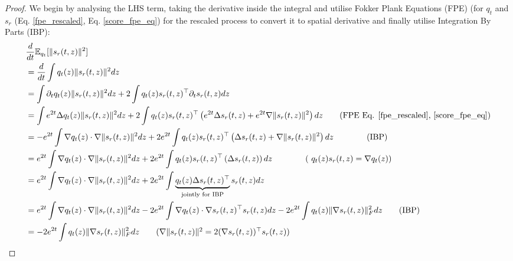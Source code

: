 \documentclass{article}
\begin{document}
\begin{proof}
We begin by analysing the LHS term, taking the derivative inside the integral and utilise Fokker Plank Equations (FPE) (for $q_t$ and $s_r$ (Eq. \ref{fpe_rescaled}, Eq. \ref{score_fpe_eq}) for the rescaled process to convert it to spatial derivative and finally utilise Integration By Parts (IBP):
\begin{align*}
    &\frac{d}{dt}\mathbb{E}_{q_t}[\|s_r(t,z)\|^2]  \\
    &= \frac{d}{dt} \int q_t(z)\|s_r(t,z)\|^2 dz\\
     &= \int \partial _t q_t(z)\|s_r(t,z)\|^2dz +  2\int q_t(z)s_r(t,z)^\top\partial_t s_r(t,z)dz\\
      &= \int e^{2t}\Delta q_t(z)\|s_r(t,z)\|^2dz +  2\int q_t(z)s_r(t,z)^\top\left(e^{2t} \Delta s_r(t,z) + e^{2t}\nabla \|s_r(t,z)\|^2\right)dz \tag{FPE Eq. \ref{fpe_rescaled}, \ref{score_fpe_eq}}\\
      &= -e^{2t}\int \nabla q_t(z) \cdot \nabla \|s_r(t,z)\|^2dz +  2e^{2t}\int q_t(z)s_r(t,z)^\top\left(\Delta s_r(t,z) + \nabla \|s_r(t,z)\|^2\right)dz \qquad \tag{IBP}\\
      &= e^{2t}\int \nabla q_t(z) \cdot \nabla \|s_r(t,z)\|^2dz +  2e^{2t}\int q_t(z)s_r(t,z)^\top\left(\Delta s_r(t,z)\right)dz \qquad \qquad \text{( $q_t(z)s_r(t,z) =\nabla q_t(z)$)}\\
      &= e^{2t}\int \nabla q_t(z) \cdot \nabla \|s_r(t,z)\|^2dz +  2e^{2t}\int \underbrace{q_t(z)\Delta s_r(t,z)^\top}_{\text{jointly for IBP}}s_r(t,z)dz \\
      &= e^{2t}\int \nabla q_t(z) \cdot \nabla \|s_r(t,z)\|^2dz -  2e^{2t}\int {\nabla q_t(z)\cdot \nabla s_r(t,z)^\top}s_r(t,z)dz - 2e^{2t}\int  q_t(z) \|\nabla s_r(t,z)\|^2_Fdz \tag{IBP} \\
      &=- 2e^{2t}\int  q_t(z) \|\nabla s_r(t,z)\|^2_Fdz  \tag{$\nabla\|s_r(t,z)\|^2 = 2(\nabla s_r(t,z))^\top s_r(t,z)$}\\
\end{align*}
\end{proof}
\end{document}
